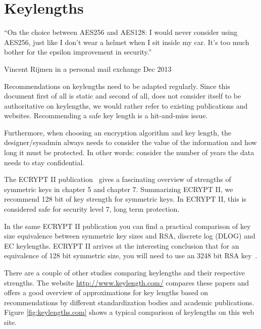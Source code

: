 \section{Keylengths}
\label{section:keylengths}


\epigraph{``On the choice between AES256 and AES128: I would never consider
using AES256, just like I don't wear a helmet when I sit inside my car. It's
too much bother for the epsilon improvement in security.''}{Vincent Rijmen
in a personal mail exchange Dec 2013}

Recommendations on keylengths need to be adapted regularly. Since this document
first of all is static and second of all, does not consider itself to be
authoritative on keylengths, we would rather refer to existing publications and
websites.  Recommending a safe key length is a hit-and-miss issue.

Furthermore, when choosing an encryption algorithm and key length, the
designer/sysadmin always needs to consider the value of the information and how
long it must be protected.  In other words: consider the number of years the
data needs to stay confidential.


The ECRYPT II publication~\cite{ii2011ecrypt} gives a fascinating overview of
strengths of symmetric keys in chapter 5 and chapter 7. Summarizing ECRYPT II, we
recommend 128 bit of key strength for symmetric keys. In ECRYPT II, this is
considered safe for security level 7, long term protection.

In the same ECRYPT II publication you can find a practical comparison of key size
equivalence between symmetric key sizes and RSA, discrete log (DLOG) and EC
keylengths. ECRYPT II arrives at the interesting conclusion that for an
equivalence of 128 bit symmetric size, you will need to use an 3248 bit RSA
key~\cite[chapter 7, page 30]{ii2011ecrypt}.


There are a couple of other studies comparing keylengths and their respective
strengths.  The website \url{http://www.keylength.com/} compares these papers
and offers a good overview of approximations for key lengths based on
recommendations by different standardization bodies and academic publications.
Figure \ref{fig:keylengths.com} shows a typical comparison of keylengths on
this web site.

